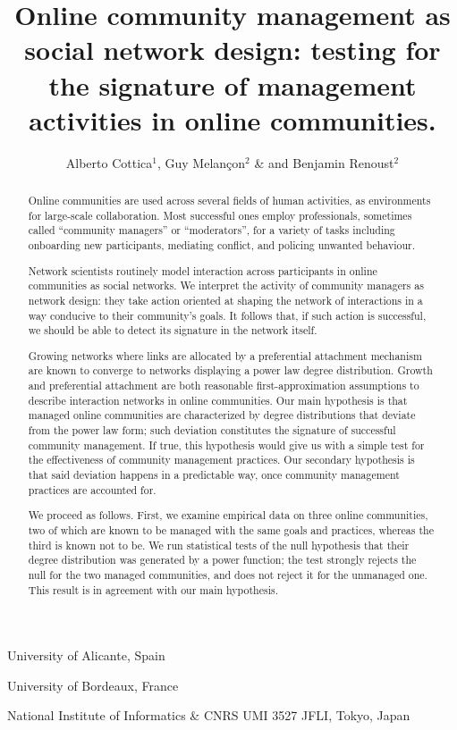 \documentclass{nature}
\title{Online community management as social network design: testing for the signature of management activities in online communities.}
\author{Alberto Cottica$^1$, Guy Melan\c {c}on$^2$ \& and Benjamin Renoust$^2$}
\begin{document}
\maketitle

\begin{affiliations}
 \item University of Alicante, Spain
 \item University of Bordeaux, France
 \item National Institute of Informatics \& CNRS UMI 3527 JFLI, Tokyo, Japan
\end{affiliations}

\begin{abstract}
Online communities are used across several fields of human activities, as environments for large-scale collaboration. Most successful ones employ professionals, sometimes called ``community managers'' or ``moderators'', for a variety of tasks including onboarding new participants, mediating conflict, and policing unwanted behaviour. 

Network scientists routinely model interaction across participants in online communities as social networks. We interpret the activity of community managers as network design: they take action oriented at shaping the network of interactions in a way conducive to their community's goals. It follows that, if such action is successful, we should be able to detect its signature in the network itself. 

Growing networks where links are allocated by a preferential attachment mechanism are known to converge to networks displaying a power law degree distribution. Growth and preferential attachment are both reasonable first-approximation assumptions to describe interaction networks in online communities. Our main hypothesis is that managed online communities are characterized by degree distributions that deviate from the power law form; such deviation constitutes the signature of successful community management. If true, this hypothesis would give us with a simple test for the effectiveness of community management practices. Our secondary hypothesis is that said deviation happens in a predictable way, once community management practices are accounted for.

We proceed as follows. First, we examine empirical data on three online communities, two of which are known to be managed with the same goals and practices, whereas the third is known not to be. We run statistical tests of the null hypothesis that their degree distribution was generated by a power function; the test strongly rejects the null for the two managed communities, and does not reject it for the unmanaged one. This result is in agreement with our main hypothesis.


\end{abstract}
\end{document}
